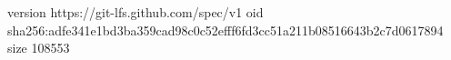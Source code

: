 version https://git-lfs.github.com/spec/v1
oid sha256:adfe341e1bd3ba359cad98c0c52efff6fd3cc51a211b08516643b2c7d0617894
size 108553
